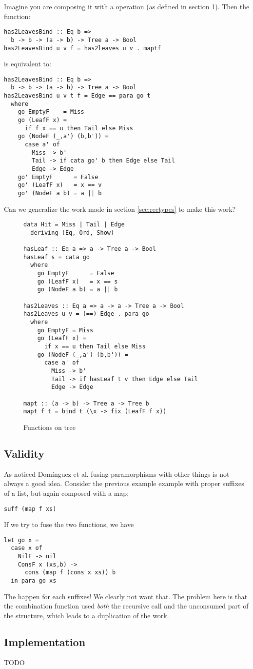 Imagine you are composing it with a  operation (as defined in section \ref{fig:has2Leaves}). Then
the function:
\begin{verbatim}
has2LeavesBind :: Eq b =>
  b -> b -> (a -> b) -> Tree a -> Bool
has2LeavesBind u v f = has2leaves u v . maptf
\end{verbatim}
\noindent is equivalent to:
\begin{verbatim}
has2LeavesBind :: Eq b =>
  b -> b -> (a -> b) -> Tree a -> Bool
has2LeavesBind u v t f = Edge == para go t
  where
    go EmptyF    = Miss
    go (LeafF x) =
      if f x == u then Tail else Miss
    go (NodeF (_,a') (b,b')) =
      case a' of
        Miss -> b'
        Tail -> if cata go' b then Edge else Tail
        Edge -> Edge
    go' EmptyF      = False
    go' (LeafF x)   = x == v
    go' (NodeF a b) = a || b
\end{verbatim}

Can we generalize the work made in section \ref{sec:rectypes} to make this work?

\begin{figure}
\begin{verbatim}
data Hit = Miss | Tail | Edge
  deriving (Eq, Ord, Show)

hasLeaf :: Eq a => a -> Tree a -> Bool
hasLeaf s = cata go
  where
    go EmptyF      = False
    go (LeafF x)   = x == s
    go (NodeF a b) = a || b

has2Leaves :: Eq a => a -> a -> Tree a -> Bool
has2Leaves u v = (==) Edge . para go
  where
    go EmptyF = Miss
    go (LeafF x) =
      if x == u then Tail else Miss
    go (NodeF (_,a') (b,b')) =
      case a' of
        Miss -> b'
        Tail -> if hasLeaf t v then Edge else Tail
        Edge -> Edge

mapt :: (a -> b) -> Tree a -> Tree b
mapt f t = bind t (\x -> fix (LeafF f x))
\end{verbatim}
\caption{Functions on tree}
\label{fig:has2Leaves}
\end{figure}

\subsection{Validity}
As noticed Domínguez et al. \cite{paramorphismFusion} fusing paramorphisms with other things is not always a good idea. Consider the previous example example with proper suffixes of a list, but again composed with a map:
\begin{verbatim}
suff (map f xs)
\end{verbatim}
\noindent If we try to fuse the two functions, we have
\begin{verbatim}
let go x =
  case x of
    NilF -> nil
    ConsF x (xs,b) -> 
      cons (map f (cons x xs)) b
  in para go xs
\end{verbatim}
\noindent The  happen for each suffixes! We clearly not want that.
The problem here is that the combination function used \emph{both} the recursive call and the unconsumed part of the structure, which leads to a duplication of the work.
\subsection{Implementation}
TODO
